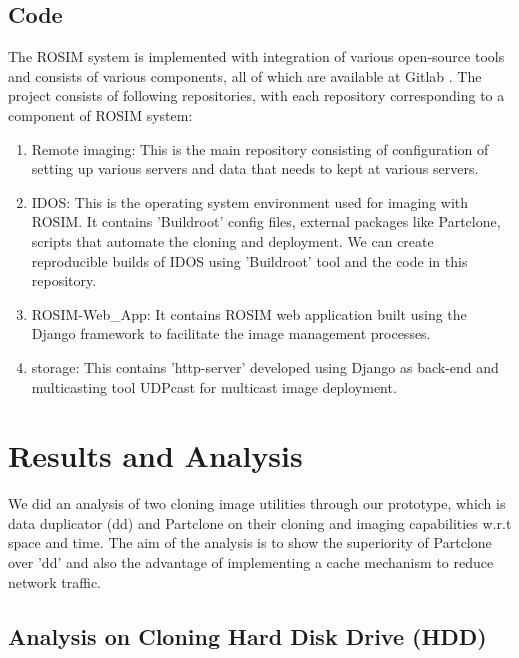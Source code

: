 \documentclass[a4paper,12pt]{article}
\begin{document}
\subsection{Code}
The ROSIM system is implemented with integration of various open-source tools and consists of various components, all of which are available at Gitlab \cite{code}. The project consists of following repositories, with each repository corresponding to a component of ROSIM system:
\begin{enumerate}[label=\roman*.]
    \item Remote imaging: This is the main repository consisting of configuration of setting up various servers and data that needs to kept at various servers.
    \item IDOS: This is the operating system environment used for imaging with ROSIM. It contains 'Buildroot' config files, external packages like Partclone, scripts that automate the cloning and deployment. We can create reproducible builds of IDOS using 'Buildroot' tool and the code in this repository.
    \item ROSIM-Web\_App: It contains ROSIM web application built using the Django framework to facilitate the image management processes.
    \item storage: This contains 'http-server' developed using Django as back-end and multicasting tool UDPcast for multicast image deployment.
\end{enumerate}
 



 \newpage
\section{\fontsize{16pt}{1em} Results and Analysis}
We did an analysis of two cloning image utilities through our prototype, which is data duplicator (dd) and Partclone on their cloning and imaging capabilities w.r.t space and time. The aim of the analysis is to show the superiority of Partclone over 'dd'  and also the advantage of implementing a cache mechanism to reduce network traffic.

\subsection{ Analysis on Cloning Hard Disk Drive (HDD) }
\end{document}
